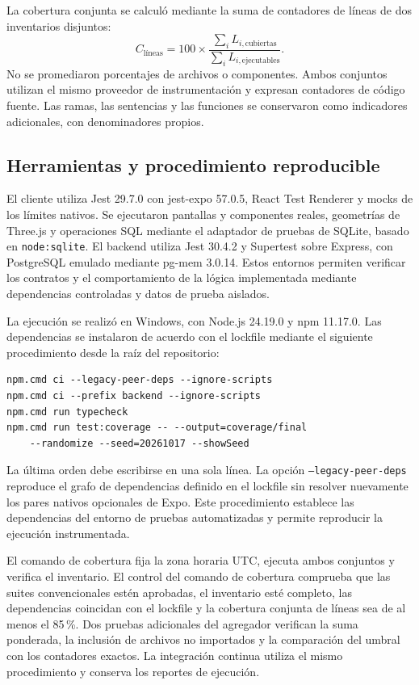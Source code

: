 La cobertura conjunta se calculó mediante la suma de contadores de líneas de dos inventarios disjuntos:
\[
C_{\mathrm{líneas}}=100\times
\frac{\sum_i L_{i,\mathrm{cubiertas}}}{\sum_i L_{i,\mathrm{ejecutables}}}.
\]
No se promediaron porcentajes de archivos o componentes. Ambos conjuntos utilizan el mismo proveedor de instrumentación y expresan contadores de código fuente. Las ramas, las sentencias y las funciones se conservaron como indicadores adicionales, con denominadores propios.

\subsection{Herramientas y procedimiento reproducible}

El cliente utiliza Jest 29.7.0 con jest-expo 57.0.5, React Test Renderer y mocks de los límites nativos. Se ejecutaron pantallas y componentes reales, geometrías de Three.js y operaciones SQL mediante el adaptador de pruebas de SQLite, basado en \texttt{node:sqlite}. El backend utiliza Jest 30.4.2 y Supertest sobre Express, con PostgreSQL emulado mediante pg-mem 3.0.14. Estos entornos permiten verificar los contratos y el comportamiento de la lógica implementada mediante dependencias controladas y datos de prueba aislados.

La ejecución se realizó en Windows, con Node.js 24.19.0 y npm 11.17.0. Las dependencias se instalaron de acuerdo con el lockfile mediante el siguiente procedimiento desde la raíz del repositorio:

\begin{verbatim}
npm.cmd ci --legacy-peer-deps --ignore-scripts
npm.cmd ci --prefix backend --ignore-scripts
npm.cmd run typecheck
npm.cmd run test:coverage -- --output=coverage/final 
    --randomize --seed=20261017 --showSeed
\end{verbatim}

La última orden debe escribirse en una sola línea. La opción \texttt{--legacy-peer-deps} reproduce el grafo de dependencias definido en el lockfile sin resolver nuevamente los pares nativos opcionales de Expo. Este procedimiento establece las dependencias del entorno de pruebas automatizadas y permite reproducir la ejecución instrumentada.

El comando de cobertura fija la zona horaria UTC, ejecuta ambos conjuntos y verifica el inventario. El control del comando de cobertura comprueba que las suites convencionales estén aprobadas, el inventario esté completo, las dependencias coincidan con el lockfile y la cobertura conjunta de líneas sea de al menos el 85\,\%. Dos pruebas adicionales del agregador verifican la suma ponderada, la inclusión de archivos no importados y la comparación del umbral con los contadores exactos. La integración continua utiliza el mismo procedimiento y conserva los reportes de ejecución.

